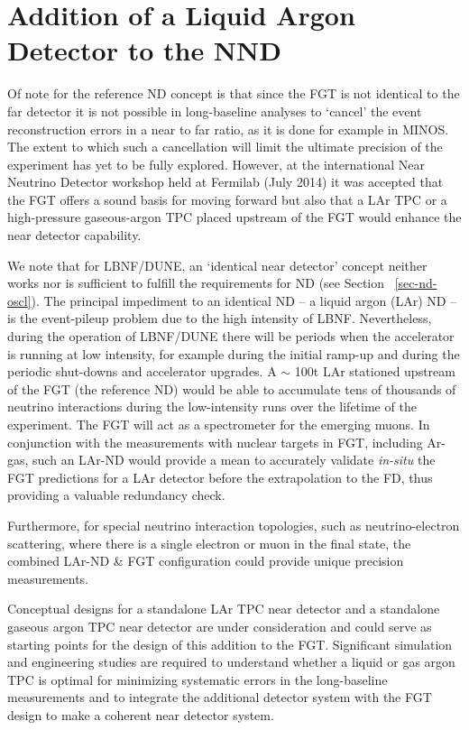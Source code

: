 \section{Addition of a Liquid Argon Detector to the NND}
\label{sec:detectors-nd-alt}

Of note for the reference ND concept is that since the FGT is not identical to the far detector it is not possible in 
long-baseline analyses to `cancel' the event reconstruction errors in a near to far ratio, as it is done for example in MINOS. 
The extent to which such a cancellation will limit the ultimate precision of the experiment has yet to be fully explored. 
However, at the international Near Neutrino Detector workshop held at Fermilab (July 2014) it was accepted that the FGT offers 
a sound basis for moving forward but also that a LAr TPC or a high-pressure gaseous-argon TPC placed upstream of the FGT 
would enhance the near detector capability.


We note that for LBNF/DUNE, an `identical near detector' concept neither works nor is sufficient to fulfill the 
requirements for ND (see Section ~\ref{sec-nd-oscl}). The principal impediment to an identical ND -- a liquid argon (LAr) ND -- 
is the event-pileup problem due to the high intensity of LBNF. Nevertheless, during the operation of LBNF/DUNE there will be 
periods when the accelerator is running at low intensity, for example during the initial ramp-up and during the periodic 
shut-downs and accelerator upgrades. A $\sim$ 100t LAr stationed upstream of the FGT (the reference ND) would be able to accumulate 
tens of thousands of neutrino interactions during the low-intensity runs over the lifetime of the experiment. 
The FGT will act as a spectrometer for the emerging muons. In conjunction with the measurements with nuclear targets in FGT, 
including Ar-gas, such an LAr-ND would provide a mean to accurately validate {\em in-situ} the FGT predictions for a LAr detector 
before the extrapolation to the FD, thus providing a valuable redundancy check. 

Furthermore, for special neutrino interaction topologies, such as neutrino-electron scattering, where there is a single 
electron or muon in the final state, the combined LAr-ND \& FGT configuration could provide unique precision measurements. 

Conceptual designs for a standalone LAr TPC near detector and a standalone gaseous argon TPC near detector are 
under consideration and could serve as starting points for the design of this addition to the FGT. 
Significant simulation and engineering studies are required to understand whether a liquid or gas argon TPC is 
optimal for minimizing systematic errors in the long-baseline measurements and to integrate the additional detector 
system with the FGT design to make a coherent near detector system.



